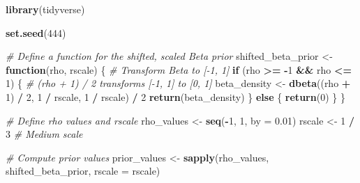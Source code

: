 \documentclass[
]{book}
\newenvironment{Shaded}{\begin{snugshade}}{\end{snugshade}}
\newcommand{\AttributeTok}[1]{\textcolor[rgb]{0.13,0.29,0.53}{#1}}
\newcommand{\CommentTok}[1]{\textcolor[rgb]{0.56,0.35,0.01}{\textit{#1}}}
\newcommand{\ControlFlowTok}[1]{\textcolor[rgb]{0.13,0.29,0.53}{\textbf{#1}}}
\newcommand{\DecValTok}[1]{\textcolor[rgb]{0.00,0.00,0.81}{#1}}
\newcommand{\FloatTok}[1]{\textcolor[rgb]{0.00,0.00,0.81}{#1}}
\newcommand{\FunctionTok}[1]{\textcolor[rgb]{0.13,0.29,0.53}{\textbf{#1}}}
\newcommand{\NormalTok}[1]{#1}
\newcommand{\OtherTok}[1]{\textcolor[rgb]{0.56,0.35,0.01}{#1}}
\newcommand{\SpecialCharTok}[1]{\textcolor[rgb]{0.81,0.36,0.00}{\textbf{#1}}}
\begin{document}
\begin{Shaded}
\begin{Highlighting}[]
\FunctionTok{library}\NormalTok{(tidyverse)}

\FunctionTok{set.seed}\NormalTok{(}\DecValTok{444}\NormalTok{)}

\CommentTok{\# Define a function for the shifted, scaled Beta prior}
\NormalTok{shifted\_beta\_prior }\OtherTok{\textless{}{-}} \ControlFlowTok{function}\NormalTok{(rho, rscale) \{}
  \CommentTok{\# Transform Beta to [{-}1, 1]}
  \ControlFlowTok{if}\NormalTok{ (rho }\SpecialCharTok{\textgreater{}=} \SpecialCharTok{{-}}\DecValTok{1} \SpecialCharTok{\&\&}\NormalTok{ rho }\SpecialCharTok{\textless{}=} \DecValTok{1}\NormalTok{) \{}
    \CommentTok{\# (rho + 1) / 2 transforms [{-}1, 1] to [0, 1]}
\NormalTok{    beta\_density }\OtherTok{\textless{}{-}} \FunctionTok{dbeta}\NormalTok{((rho }\SpecialCharTok{+} \DecValTok{1}\NormalTok{) }\SpecialCharTok{/} \DecValTok{2}\NormalTok{, }\DecValTok{1} \SpecialCharTok{/}\NormalTok{ rscale, }\DecValTok{1} \SpecialCharTok{/}\NormalTok{ rscale) }\SpecialCharTok{/} \DecValTok{2}
    \FunctionTok{return}\NormalTok{(beta\_density)}
\NormalTok{  \} }\ControlFlowTok{else}\NormalTok{ \{}
    \FunctionTok{return}\NormalTok{(}\DecValTok{0}\NormalTok{)}
\NormalTok{  \}}
\NormalTok{\}}

\CommentTok{\# Define rho values and rscale}
\NormalTok{rho\_values }\OtherTok{\textless{}{-}} \FunctionTok{seq}\NormalTok{(}\SpecialCharTok{{-}}\DecValTok{1}\NormalTok{, }\DecValTok{1}\NormalTok{, }\AttributeTok{by =} \FloatTok{0.01}\NormalTok{)}
\NormalTok{rscale }\OtherTok{\textless{}{-}} \DecValTok{1} \SpecialCharTok{/} \DecValTok{3}  \CommentTok{\# Medium scale}

\CommentTok{\# Compute prior values}
\NormalTok{prior\_values }\OtherTok{\textless{}{-}} \FunctionTok{sapply}\NormalTok{(rho\_values, shifted\_beta\_prior, }\AttributeTok{rscale =}\NormalTok{ rscale)}


\end{Highlighting}
\end{Shaded}
\end{document}

